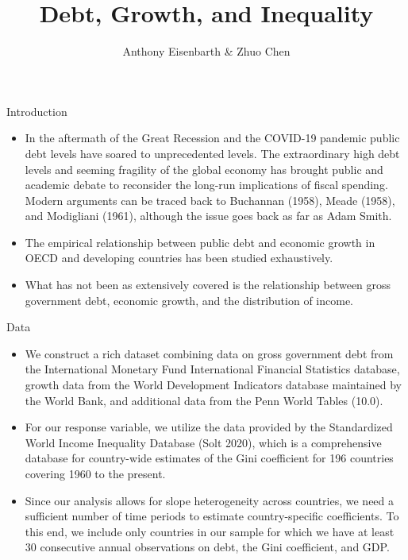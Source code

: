 \documentclass[10pt]{beamer}
\title{Debt, Growth, and Inequality}
\author{Anthony Eisenbarth \& Zhuo Chen}
\begin{document}
\begin{frame}[plain]
    \maketitle
\end{frame}
\begin{frame}{Introduction}
	
\begin{itemize}
	\item 
	In the aftermath of the Great Recession and the COVID-19 pandemic public debt levels have soared to unprecedented levels. The extraordinary high debt levels and seeming fragility of the global economy has brought public and academic debate to reconsider the long-run implications of fiscal spending. Modern arguments can be traced back to Buchannan (1958), Meade (1958), and Modigliani (1961), although the issue goes back as far as Adam Smith.
	\item The empirical relationship between public debt and economic growth in OECD and developing countries has been studied exhaustively.
	\item What has not been as extensively covered is the relationship between gross government debt, economic growth, and the distribution of income.
	\end{itemize}
\end{frame}

\begin{frame}{Data}
\begin{itemize}
	\item We construct a rich dataset combining data on gross government debt from the International Monetary Fund International Financial Statistics database, growth data from the World Development Indicators database maintained by the World Bank, and additional data from the Penn World Tables (10.0).
	\item For our response variable, we utilize the data provided by the Standardized World Income Inequality Database (Solt 2020), which is a comprehensive database for country-wide estimates of the Gini coefficient for 196 countries covering 1960 to the present.
	\item Since our analysis allows for slope heterogeneity across countries, we need a sufficient
	number of time periods to estimate country-specific coefficients. To this end, we include only countries in our sample for which we have at least 30 consecutive annual observations on debt, the Gini coefficient, and GDP. 
\end{itemize}
\end{frame}
\end{document}
